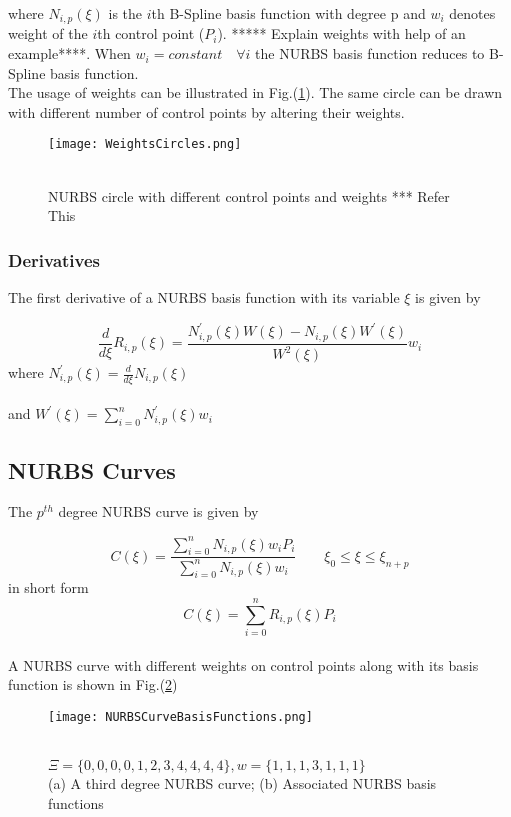 \documentclass[11pt]{article}
\begin{document}
\noindent
where $N_{i,p}(\xi)$ is the $i$th B-Spline basis function with degree p and
$w_{i}$ denotes weight of the $i$th control point ($P_i$). ***** Explain weights
with help of an example****. When $w_{i} = constant \quad \forall i$ the NURBS
basis function reduces to B-Spline basis function.
\\The usage of weights can be illustrated in Fig.(\ref{WeightsCircles}). The same circle can be drawn with different number of control points by altering their weights.
\begin{figure}[H]
	\begin{center}
		\texttt{[image: WeightsCircles.png]} 
		\caption{\\NURBS circle with different control points and weights *** Refer This}\label{WeightsCircles}
	\end{center}	
\end{figure}

\subsubsection{Derivatives}
The first derivative of a NURBS basis function with its variable $\xi$ is given
by \cite{nguyen2012introduction}

\begin{equation}
\frac{d }{d \xi} R_{i,p}(\xi) = \frac{N^{'}_{i,p}(\xi)  W(\xi) - N_{i,p}(\xi) 
	W^{'}(\xi)}{W^{2}(\xi)}w_{i}
\end{equation}
\noindent
where
$N^{'}_{i,p}(\xi) = \frac{d }{d \xi} N_{i,p}(\xi)$  \\
\\
\noindent
and $W^{'}(\xi) =  \sum_{i=0}^{n}N^{'}_{i,p}(\xi) w_i$


\subsection{NURBS Curves }
The $p^{th}$ degree NURBS curve is given by \cite{piegl2012nurbs}

\begin{equation}
C(\xi) =
\frac{\sum_{i=0}^{n}N_{i,p}(\xi)w_{i}P_{i}}{\sum_{i=0}^{n}N_{i,p}(\xi)w_{i}}
\qquad \xi_0 \leq \xi \leq \xi_{n+p}
\end{equation}
in short form
\begin{equation}
C(\xi) = \sum_{i=0}^{n}R_{i,p}(\xi)P_{i}
\end{equation}
\\
A NURBS curve with different weights on control points along with its basis function is shown in Fig.(\ref{NURBSCurveBasisFunctions})
\begin{figure}[H]
	\begin{center}
		\texttt{[image: NURBSCurveBasisFunctions.png]} 
		\caption{\\$\Xi=\{0,0,0,0,1,2,3,4,4,4,4\}, w = \{1,1,1,3,1,1,1\}$\\(a) A third degree NURBS curve; (b) Associated NURBS basis functions \cite{piegl2012nurbs}}\label{NURBSCurveBasisFunctions}
	\end{center}	
\end{figure}
\end{document}
